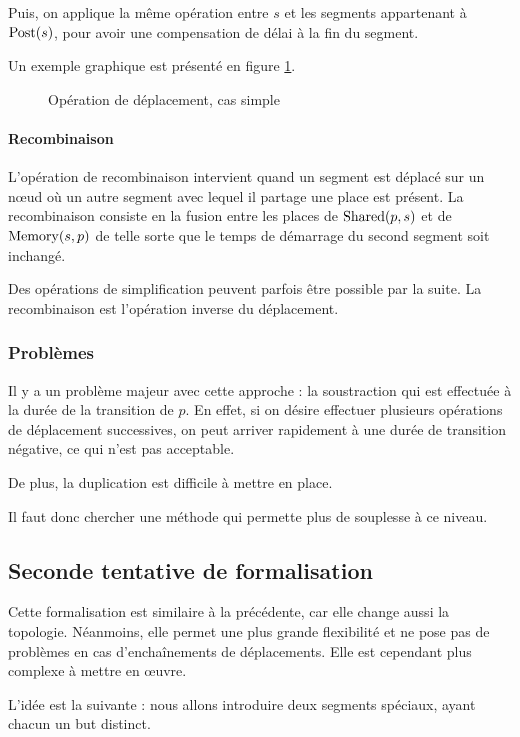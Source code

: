 Puis, on applique la même opération entre $s$ et les segments appartenant à $\operatorname{Post}(s)$, pour avoir une compensation de délai à la fin du segment.

Un exemple graphique est présenté en figure \ref{fig:deplacementMethode1}.

\begin{figure}[h!]
\centering

\caption{Opération de déplacement, cas simple}
\label{fig:deplacementMethode1}
\end{figure}

\paragraph{Recombinaison}
L'opération de recombinaison intervient quand un segment est déplacé sur un nœud où un autre segment avec lequel il partage une place est présent.
La recombinaison consiste en la fusion entre les places de $\operatorname{Shared}(p, s)$ et de  $\operatorname{Memory}(s, p)$ de telle sorte que le temps de démarrage du second segment soit inchangé.

Des opérations de simplification peuvent parfois être possible par la suite.
La recombinaison est l'opération inverse du déplacement.

\subsubsection{Problèmes}
Il y a un problème majeur avec cette approche : la soustraction qui est effectuée à la durée de la transition de $p$. En effet, si on désire effectuer plusieurs opérations de déplacement successives, on peut arriver rapidement à une durée de transition négative, ce qui n'est pas acceptable.

De plus, la duplication est difficile à mettre en place.

Il faut donc chercher une méthode qui permette plus de souplesse à ce niveau.

\subsection{Seconde tentative de formalisation}
Cette formalisation est similaire à la précédente, car elle change aussi la topologie. Néanmoins, elle permet une plus grande flexibilité et ne pose pas de problèmes en cas d'enchaînements de déplacements.
Elle est cependant plus complexe à mettre en œuvre.

L'idée est la suivante : nous allons introduire deux segments spéciaux, ayant chacun un but distinct.

